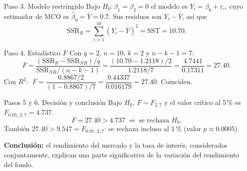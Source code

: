 \documentclass[11pt,letterpaper]{article}
\newcommand{\SSR}{\mathrm{SSR}}
\newcommand{\SST}{\mathrm{SST}}
\begin{document}
\begin{paso}{Paso 3. Modelo restringido}
Bajo $H_0:\beta_1=\beta_2=0$ el modelo es $Y_i=\beta_0+\varepsilon_i$, cuyo estimador de MCO es
$\hat\beta_0=\bar Y=0.7$. Sus residuos son $Y_i-\bar Y$, así que
\[
\SSR_R=\sum_{i=1}^{10}(Y_i-\bar Y)^2=\SST=10.70 .
\]
\end{paso}

\begin{paso}{Paso 4. Estadístico $F$}
Con $q=2$, $n=10$, $k=2$ y $n-k-1=7$:
\[
F=\frac{(\SSR_R-\SSR_{NR})/q}{\SSR_{NR}/(n-k-1)}
=\frac{(10.70-1.2118)/2}{1.2118/7}
=\frac{4.7441}{0.17311}=27.40 .
\]
Con $R^2$: $\;F=\dfrac{0.8867/2}{(1-0.8867)/7}=\dfrac{0.44337}{0.016179}=27.40$. Coinciden.
\end{paso}

\begin{paso}{Pasos 5 y 6. Decisión y conclusión}
Bajo $H_0$, $F\sim F_{2,7}$ y el valor crítico al 5\,\% es $F_{0.05;\,2,7}=4.737$.
\[
F=27.40>4.737\ \Longrightarrow\ \text{se rechaza }H_0 .
\]
También $27.40>9.547=F_{0.01;\,2,7}$: se rechaza incluso al 1\,\% (valor $p\approx0.0005$).

\textbf{Conclusión:} el rendimiento del mercado y la tasa de interés, considerados conjuntamente,
explican una parte significativa de la variación del rendimiento del fondo.
\end{paso}

\begin{center}
\end{center}
\end{document}
